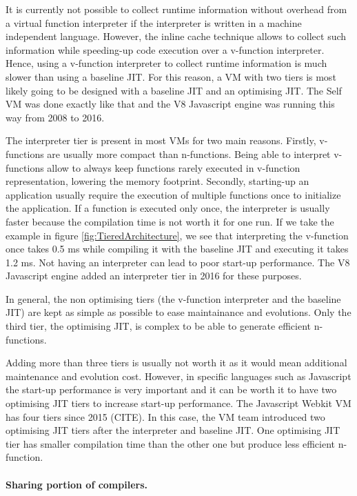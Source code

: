 \documentclass[a4paper,12pt,twoside]{../includes/ThesisStyle}
\begin{document}
It is currently not possible to collect runtime information without overhead from a virtual function interpreter if the interpreter is written in a machine independent language. However, the inline cache technique allows to collect such information while speeding-up code execution over a v-function interpreter. Hence, using a v-function interpreter to collect runtime information is much slower than using a baseline JIT. For this reason, a VM with two tiers is most likely going to be designed with a baseline JIT and an optimising JIT. The Self VM was done exactly like that and the V8 Javascript engine was running this way from 2008 to 2016.

The interpreter tier is present in most VMs for two main reasons. Firstly, v-functions are usually more compact than n-functions. Being able to interpret v-functions allow to always keep functions rarely executed in v-function representation, lowering the memory footprint. Secondly, starting-up an application usually require the execution of multiple functions once to initialize the application. If a function is executed only once, the interpreter is usually faster because the compilation time is not worth it for one run. If we take the example in figure \ref{fig:TieredArchitecture}, we see that interpreting the v-function once takes 0.5 ms while compiling it with the baseline JIT and executing it takes 1.2 ms. Not having an interpreter can lead to poor start-up performance. The V8 Javascript engine added an interpreter tier in 2016 for these purposes.

In general, the non optimising tiers (the v-function interpreter and the baseline JIT) are kept as simple as possible to ease maintainance and evolutions. Only the third tier, the optimising JIT, is complex to be able to generate efficient n-functions.

Adding more than three tiers is usually not worth it as it would mean additional maintenance and evolution cost. However, in specific languages such as Javascript the start-up performance is very important and it can be worth it to have two optimising JIT tiers to increase start-up performance. The Javascript Webkit VM has four tiers since 2015 (CITE). In this case, the VM team introduced two optimising JIT tiers after the interpreter and baseline JIT. One optimising JIT tier has smaller compilation time than the other one but produce less efficient n-function.

\paragraph{Sharing portion of compilers.}
\end{document}

